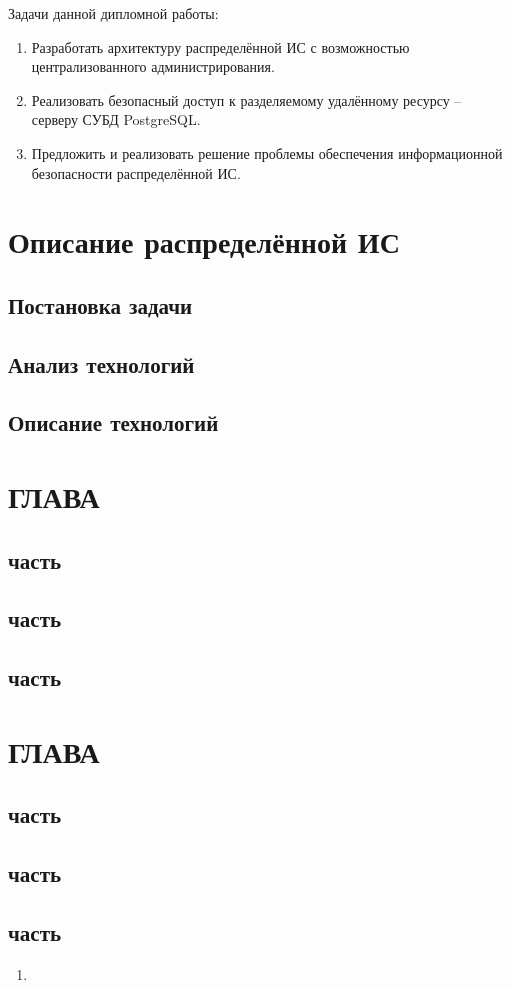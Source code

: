 \documentclass{../class/UIR}
\begin{document}
Задачи данной дипломной работы:
\begin{enumerate}
\item Разработать  архитектуру распределённой ИС с возможностью централизованного администрирования.
\item Реализовать безопасный доступ к разделяемому удалённому ресурсу – серверу СУБД PostgreSQL.
\item Предложить  и реализовать решение проблемы обеспечения информационной безопасности распределённой ИС.
\end{enumerate}



\section{Описание распределённой ИС}	

\subsection{Постановка задачи}
\subsection{Анализ технологий}
\subsection{Описание технологий}

\section{ГЛАВА}
\subsection{часть}
\subsection{часть}
\subsection{часть}

\section{ГЛАВА}
\subsection{часть}
\subsection{часть}
\subsection{часть}
		


\begin{enumerate}
\item 
\end{enumerate}


\begin{ReviewOfSupervisor}

\end{ReviewOfSupervisor}
\end{document}
